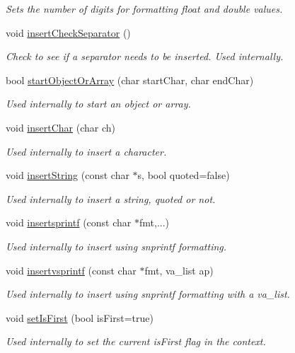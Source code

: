 \begin{DoxyCompactItemize}
\begin{DoxyCompactList}\small\item\em Sets the number of digits for formatting float and double values. \end{DoxyCompactList}\item 
void \hyperlink{class_json_writer_ab773cf0a021f402f2cef3c14694f18da}{insert\+Check\+Separator} ()
\begin{DoxyCompactList}\small\item\em Check to see if a separator needs to be inserted. Used internally. \end{DoxyCompactList}\item 
bool \hyperlink{class_json_writer_a468e6c475bec83a7ec8cd7048cdbb31b}{start\+Object\+Or\+Array} (char start\+Char, char end\+Char)
\begin{DoxyCompactList}\small\item\em Used internally to start an object or array. \end{DoxyCompactList}\item 
void \hyperlink{class_json_writer_ad286fab5e961490da5e17816f277f23c}{insert\+Char} (char ch)
\begin{DoxyCompactList}\small\item\em Used internally to insert a character. \end{DoxyCompactList}\item 
void \hyperlink{class_json_writer_acf5ad9145b651c78873a71abbe372c9b}{insert\+String} (const char $\ast$s, bool quoted=false)
\begin{DoxyCompactList}\small\item\em Used internally to insert a string, quoted or not. \end{DoxyCompactList}\item 
void \hyperlink{class_json_writer_a8a584941a871018cd09315276b8bf7ca}{insertsprintf} (const char $\ast$fmt,...)
\begin{DoxyCompactList}\small\item\em Used internally to insert using snprintf formatting. \end{DoxyCompactList}\item 
void \hyperlink{class_json_writer_ab737d9527845638e08bd71034d419e49}{insertvsprintf} (const char $\ast$fmt, va\+\_\+list ap)
\begin{DoxyCompactList}\small\item\em Used internally to insert using snprintf formatting with a va\+\_\+list. \end{DoxyCompactList}\item 
void \hyperlink{class_json_writer_afc30ff673c866c7a2366a8c064b5a565}{set\+Is\+First} (bool is\+First=true)
\begin{DoxyCompactList}\small\item\em Used internally to set the current is\+First flag in the context. \end{DoxyCompactList}\end{DoxyCompactItemize}
